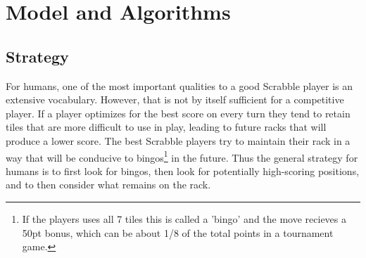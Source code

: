 \documentclass[12pt]{article}
\begin{document}
\section*{Model and Algorithms}

\subsection{Strategy}

For humans, one of the most important qualities to a good Scrabble
player is an extensive vocabulary. However, that is not by itself
sufficient for a competitive player. If a player optimizes for the
best score on every turn they tend to retain tiles that are more
difficult to use in play, leading to future racks that will produce a
lower score. The best Scrabble players try to maintain their rack in a
way that will be conducive to bingos\footnote{If the players uses all
  7 tiles this is called a 'bingo' and the move recieves a 50pt bonus,
  which can be about 1/8 of the total points in a tournament game.} in
the future. Thus the general strategy for humans is to first look for
bingos, then look for potentially high-scoring positions, and to then
consider what remains on the rack.
\end{document}
